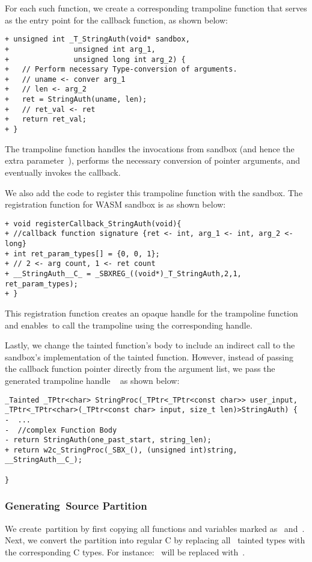 For each such function, we create a corresponding trampoline function that serves as the entry point for the callback function, as shown below:
\begin{verbatim}
+ unsigned int _T_StringAuth(void* sandbox,
+               unsigned int arg_1,
+               unsigned long int arg_2) {
+   // Perform necessary Type-conversion of arguments.
+   // uname <- conver arg_1
+   // len <- arg_2
+   ret = StringAuth(uname, len);
+   // ret_val <- ret
+   return ret_val;
+ }
\end{verbatim}

The trampoline function handles the invocations from sandbox (and hence the extra parameter~), performs the necessary conversion of pointer arguments, and eventually invokes the callback.

We also add the code to register this trampoline function with the sandbox. The registration function for WASM sandbox is as shown below:
\begin{verbatim}
+ void registerCallback_StringAuth(void){
+ //callback function signature {ret <- int, arg_1 <- int, arg_2 <- long}
+ int ret_param_types[] = {0, 0, 1};
+ // 2 <- arg count, 1 <- ret count
+ __StringAuth__C_ = _SBXREG_((void*)_T_StringAuth,2,1, ret_param_types);
+ }
\end{verbatim}
This registration function creates an opaque handle for the trampoline function and enables~\ucregion to call the trampoline using the corresponding handle.

Lastly, we change the tainted function's body to include an indirect call to the sandbox's implementation of the tainted function. However, instead of passing the callback function pointer directly from the argument list, we pass the generated trampoline handle ~ as shown below:
\begin{verbatim}
_Tainted _TPtr<char> StringProc(_TPtr<_TPtr<const char>> user_input,
_TPtr<_TPtr<char>(_TPtr<const char> input, size_t len)>StringAuth) {
-  ...
-  //complex Function Body       
- return StringAuth(one_past_start, string_len);
+ return w2c_StringProc(_SBX_(), (unsigned int)string, __StringAuth__C_);

}
\end{verbatim}

\subsubsection{Generating~\ucregion Source Partition}
\label{subsubsec:genucregion}
We create~\ucregion partition by first copying all functions and variables marked as~ and~.
Next, we convert the partition into regular C by replacing all~\systemname{} tainted types with the corresponding C types.
\newline
For instance:~ will be replaced with~.

